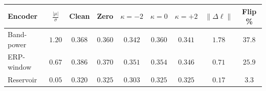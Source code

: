 \begin{tabular}{lcccccccc}
\toprule
Encoder & $\frac{|\mu|}{\sigma}$ & Clean & Zero & $\kappa{=}{-2}$ & $\kappa{=}0$ & $\kappa{=}{+2}$ & $\lVert\Delta\ell\rVert$ & Flip \% \\
\midrule
Band-power & $1.20$ & $0.368$ & $0.360$ & $0.342$ & $0.360$ & $0.341$ & $1.78$ & $37.8$ \\
ERP-window & $0.67$ & $0.386$ & $0.370$ & $0.351$ & $0.354$ & $0.346$ & $0.71$ & $25.9$ \\
Reservoir & $0.05$ & $0.320$ & $0.325$ & $0.303$ & $0.325$ & $0.325$ & $0.17$ & $3.3$ \\
\bottomrule
\end{tabular}
